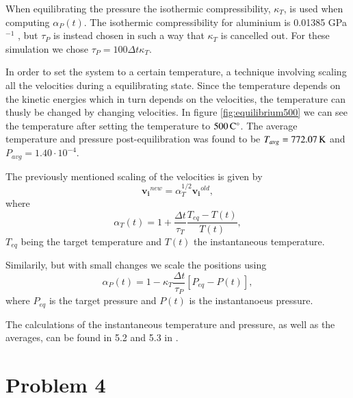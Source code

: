 When equilibrating the pressure the isothermic compressibility, $\kappa_T$, is used when computing $\alpha_P(t)$. The isothermic compressibility for aluminium is 0.01385 GPa$^{-1}$ \cite{knowledgedoor}, but $\tau_P$ is instead chosen in such a way that $\kappa_T$ is cancelled out. For these simulation we chose $\tau_P = 100\Delta t \kappa_T$.

In order to set the system to a certain temperature, a technique involving scaling all the velocities during a equilibrating state. Since the temperature depends on the kinetic energies which in turn depends on the velocities, the  temperature can thusly be changed by changing velocities. In figure \ref{fig:equilibrium500} we can see the temperature after setting the temperature to $\unit[500]{C^\circ}$. The average temperature and pressure post-equilibration was found to be $T_{avg}=\unit[772.07]{K}$ and $P_{avg}=1.40\cdot 10^{-4}$.

The previously mentioned scaling of the velocities is given by
\begin{equation}
\mathbf{v_i}^{new} = \alpha_T^{1/2}\mathbf{v_i}^{old},
\end{equation}
where
\begin{equation}
\alpha_T(t) = 1+\frac{\Delta t}{\tau_T}\frac{T_{eq}-T(t)}{T(t)},
\end{equation}
$T_{eq}$ being the target temperature and $T(t)$ the instantaneous temperature.

Similarily, but with small changes we scale the positions using
\begin{equation}
\alpha_P(t)=1-\kappa_T\frac{\Delta t}{\tau_P}\left[P_{eq}-P(t)\right],
\end{equation}
where $P_{eq}$ is the target pressure and $P(t)$ is the instantanoeus pressure.

The calculations of the instantaneous temperature and pressure, as well as the averages, can be found in 5.2 and 5.3 in \cite{lecnotes}.


\section*{Problem 4}

